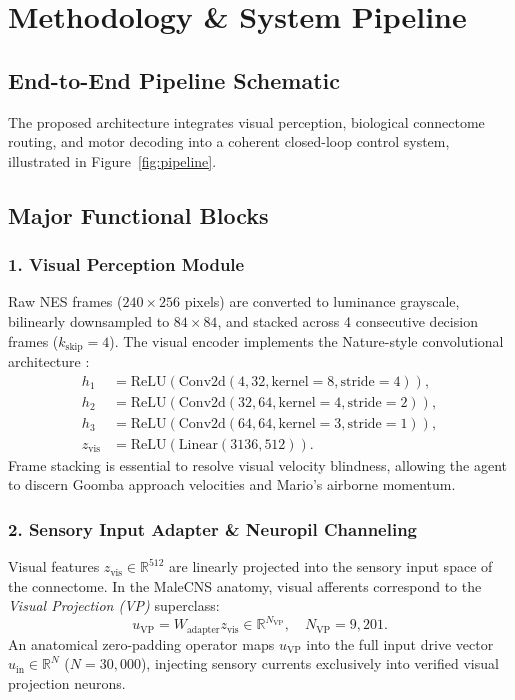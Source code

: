 \documentclass[10pt,twocolumn]{article}
\begin{document}
\section{Methodology \& System Pipeline}
\label{sec:methodology}

\subsection{End-to-End Pipeline Schematic}
The proposed architecture integrates visual perception, biological connectome routing, and motor decoding into a coherent closed-loop control system, illustrated in Figure~\ref{fig:pipeline}.

\subsection{Major Functional Blocks}

\subsubsection{1. Visual Perception Module}
Raw NES frames ($240 \times 256$ pixels) are converted to luminance grayscale, bilinearly downsampled to $84 \times 84$, and stacked across 4 consecutive decision frames ($k_{\text{skip}} = 4$). The visual encoder implements the Nature-style convolutional architecture \cite{mnih2015human}:
\begin{align}
    h_1 &= \text{ReLU}(\text{Conv2d}(4, 32, \text{kernel}=8, \text{stride}=4)), \\
    h_2 &= \text{ReLU}(\text{Conv2d}(32, 64, \text{kernel}=4, \text{stride}=2)), \\
    h_3 &= \text{ReLU}(\text{Conv2d}(64, 64, \text{kernel}=3, \text{stride}=1)), \\
    z_{\text{vis}} &= \text{ReLU}(\text{Linear}(3136, 512)).
\end{align}
Frame stacking is essential to resolve visual velocity blindness, allowing the agent to discern Goomba approach velocities and Mario's airborne momentum.

\subsubsection{2. Sensory Input Adapter \& Neuropil Channeling}
Visual features $z_{\text{vis}} \in \mathbb{R}^{512}$ are linearly projected into the sensory input space of the connectome. In the MaleCNS anatomy, visual afferents correspond to the \textit{Visual Projection (VP)} superclass:
\begin{equation}
    u_{\text{VP}} = W_{\text{adapter}} z_{\text{vis}} \in \mathbb{R}^{N_{\text{VP}}}, \quad N_{\text{VP}} = 9,201.
\end{equation}
An anatomical zero-padding operator maps $u_{\text{VP}}$ into the full input drive vector $u_{\text{in}} \in \mathbb{R}^N$ ($N = 30,000$), injecting sensory currents exclusively into verified visual projection neurons.
\end{document}
